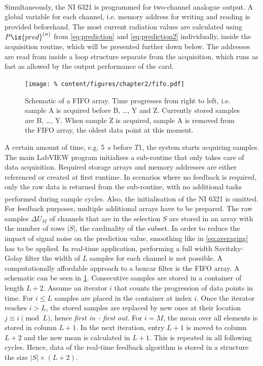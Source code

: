             Simultaneously, the NI\textsuperscript{\textregistered} 6321 is programmed for two-channel analogue output. A global variable for each channel, i.e. memory address for writing and reading is provided beforehand. The most current radiation values are calculated using $P\ix{pred}^{\left(n\right)}$ from \cref{eq:prediction} and \cref{eq:prediction2} individually, inside the acquisition routine, which will be presented further down below. The addresses are read from inside a loop structure separate from the acquisition, which runs as fast as allowed by the output performance of the card.\\%
%
            \begin{figure}[t]%
                \centering%
                \texttt{[image: \%
                    content/figures/chapter2/fifo.pdf]}%
                \caption{Schematic of a FIFO array. Time progresses from right to left, i.e. sample A is acquired before B, \dots, Y and Z. Currently stored samples are B, \dots, Y. When sample Z is acquired, sample A is removed from the FIFO array, the oldest data point at this moment.}\label{fig:fifo}
            \end{figure}%
%
            A certain amount of time, e.g. \SI{5}{\second} before $T1$, the system starts acquiring samples. The main LabVIEW program initialises a sub-routine that only takes care of data acquisition. Required storage arrays and memory addresses are either referenced or created at first runtime. In scenarios where no feedback is required, only the raw data is returned from the sub-routine, with no additional tasks performed during sample cycles. Also, the initialisation of the NI\textsuperscript{\textregistered} 6321 is omitted. For feedback purposes, multiple additional arrays have to be prepared. The raw samples $\Delta U_{M}$ of channels that are in the selection $S$ are stored in an array with the number of rows $\vert S\vert$, the cardinality of the subset. In order to reduce the impact of signal noise on the prediction value, smoothing like in \cref{eq:averaging} has to be applied. In real-time application, performing a full width Savitzky-Golay filter the width of $L$ samples for each channel is not possible. A computationally affordable approach to a boxcar filter is the FIFO array. A schematic can be seen in \cref{fig:fifo}. Consecutive samples are stored in a container of length $L+2$. Assume an iterator $i$ that counts the progression of data points in time. For $i\le L$ samples are placed in the container at index $i$. Once the iterator reaches $i>L$, the stored samples are replaced by new ones at their location $j\equiv i\pmod{L}$, hence \textit{first in - first out}. For $i=M$, the mean over all elements is stored in column $L+1$. In the next iteration, entry $L+1$ is moved to column $L+2$ and the new mean is calculated in $L+1$. This is repeated in all following cycles. Hence, data of the real-time feedback algorithm is stored in a structure the size $\vert S\vert\times\left(L+2\right)$.\\%
